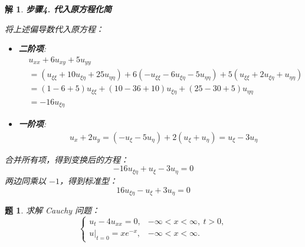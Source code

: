 \documentclass[12pt,a4paper]{article}
\newtheorem{problem}{题}
\newtheorem*{solution}{解}
\begin{document}
\begin{solution}
		\hrulefill
		
		\textbf{步骤4. 代入原方程化简}
		
		\noindent
		将上述偏导数代入原方程：
		\begin{itemize}
			\item \textbf{二阶项}:
			\begin{align*}
				& u_{xx} + 6u_{xy} + 5u_{yy} \\
				&= (u_{\xi\xi} + 10u_{\xi\eta} + 25u_{\eta\eta}) + 6(-u_{\xi\xi} - 6u_{\xi\eta} - 5u_{\eta\eta}) + 5(u_{\xi\xi} + 2u_{\xi\eta} + u_{\eta\eta}) \\
				&= (1 - 6 + 5)u_{\xi\xi} + (10 - 36 + 10)u_{\xi\eta} + (25 - 30 + 5)u_{\eta\eta} \\
				&= -16u_{\xi\eta}
			\end{align*}
			\item \textbf{一阶项}:
			\begin{align*}
				& u_x + 2u_y = (-u_\xi - 5u_\eta) + 2(u_\xi + u_\eta) = u_\xi - 3u_\eta
			\end{align*}
		\end{itemize}
		合并所有项，得到变换后的方程：
		\[
		-16u_{\xi\eta} + u_\xi - 3u_\eta = 0
		\]
		两边同乘以 $-1$，得到标准型：
		\[
		16u_{\xi\eta} - u_\xi + 3u_\eta = 0
		\]
	\end{solution}
		\hrulefill
	\begin{problem}
		求解 Cauchy 问题：
		\[
		\begin{cases}
			u_t - 4u_{xx} = 0, & -\infty < x < \infty, \ t > 0, \\
			u|_{t=0} = xe^{-x}, & -\infty < x < \infty.
		\end{cases}
		\]
	\end{problem}
	\hrulefill
\end{document}
